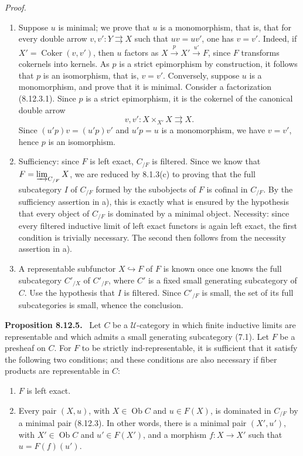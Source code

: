 \documentclass[11pt]{article}
\newcommand{\U}{\mathcal{U}}
\newcommand{\Ob}{\operatorname{Ob}}
\newcommand{\Coker}{\operatorname{Coker}}
\newenvironment{statement}[1]{\par\medskip\noindent\textbf{#1.}\ }{\par\medskip}
\newenvironment{prooftext}{\par\noindent\emph{Proof.}\ }{\par\medskip}
\begin{document}
\begin{prooftext}
\begin{enumerate}[label=\alph*)]
\item Suppose $u$ is minimal; we prove that $u$ is a monomorphism, that is, that for every double arrow $v,v':Y\rightrightarrows X$ such that $uv=uv'$, one has $v=v'$. Indeed, if $X'=\Coker(v,v')$, then $u$ factors as $X\xrightarrow{p}X'\xrightarrow{u'}F$, since $F$ transforms cokernels into kernels. As $p$ is a strict epimorphism by construction, it follows that $p$ is an isomorphism, that is, $v=v'$. Conversely, suppose $u$ is a monomorphism, and prove that it is minimal. Consider a factorization (8.12.3.1). Since $p$ is a strict epimorphism, it is the cokernel of the canonical double arrow
\[
 v,v': X\times_{X'}X\rightrightarrows X.
\]
Since $(u'p)v=(u'p)v'$ and $u'p=u$ is a monomorphism, we have $v=v'$, hence $p$ is an isomorphism.

\item Sufficiency: since $F$ is left exact, $C_{/F}$ is filtered. Since we know that $F=\varinjlim_{C_{/F}}X$, we are reduced by 8.1.3(c) to proving that the full subcategory $I$ of $C_{/F}$ formed by the subobjects of $F$ is cofinal in $C_{/F}$. By the sufficiency assertion in a), this is exactly what is ensured by the hypothesis that every object of $C_{/F}$ is dominated by a minimal object. Necessity: since every filtered inductive limit of left exact functors is again left exact, the first condition is trivially necessary. The second then follows from the necessity assertion in a).

\item A representable subfunctor $X\hookrightarrow F$ of $F$ is known once one knows the full subcategory $C'_{/X}$ of $C'_{/F}$, where $C'$ is a fixed small generating subcategory of $C$. Use the hypothesis that $I$ is filtered. Since $C'_{/F}$ is small, the set of its full subcategories is small, whence the conclusion.
\end{enumerate}
\end{prooftext}

\begin{statement}{Proposition 8.12.5}
Let $C$ be a $\U$-category in which finite inductive limits are representable and which admits a small generating subcategory (7.1). Let $F$ be a presheaf on $C$. For $F$ to be strictly ind-representable, it is sufficient that it satisfy the following two conditions; and these conditions are also necessary if fiber products are representable in $C$:
\begin{enumerate}[label=\alph*)]
\item $F$ is left exact.

\item Every pair $(X,u)$, with $X\in\Ob C$ and $u\in F(X)$, is dominated in $C_{/F}$ by a minimal pair (8.12.3). In other words, there is a minimal pair $(X',u')$, with $X'\in\Ob C$ and $u'\in F(X')$, and a morphism $f:X\to X'$ such that $u=F(f)(u')$.
\end{enumerate}
\end{statement}
\end{document}
